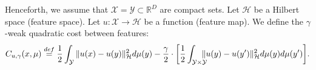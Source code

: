 \documentclass{article} %
\newtheorem{lemma}{Lemma}
\begin{document}
Henceforth, we assume that $\mathcal{X}\!=\!\mathcal{Y}\!\subset\! \mathbb{R}^{D}$ are compact sets. Let $\mathcal{H}$ be a Hilbert space (feature space). Let $u:\mathcal{X}\rightarrow\mathcal{H}$ be a function (feature map).
We define the $\gamma$-weak quadratic cost between features:
\begin{equation}
    C_{u,\gamma}(x,\mu)\stackrel{def}{=}\frac{1}{2}\int_{\mathcal{Y}}\|u(x)-u(y)\|^{2}_{\mathcal{H}}d\mu(y)-\frac{\gamma}{2}\cdot\bigg[\frac{1}{2}\int_{\mathcal{Y}\times\mathcal{Y}}\hspace{-3mm}\|u(y)-u(y')\|_{\mathcal{H}}^{2}d\mu(y)d\mu(y')\bigg].
    \label{u-cost}
    \vspace{-1mm}
\end{equation}



\end{document}
